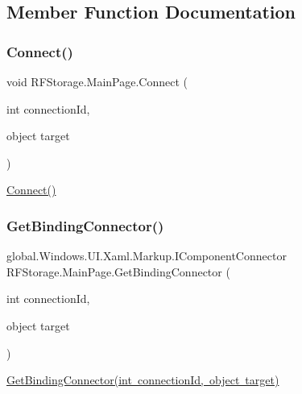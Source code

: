 \subsection{Member Function Documentation}
\mbox{\label{class_r_f_storage_1_1_main_page_a3d153ccb2e1e207f6861ab7734d25553}} 
\subsubsection{\texorpdfstring{Connect()}{Connect()}}
{\footnotesize\ttfamily void R\+F\+Storage.\+Main\+Page.\+Connect (\begin{DoxyParamCaption}\item[{int}]{connection\+Id,  }\item[{object}]{target }\end{DoxyParamCaption})}



\mbox{\hyperlink{class_r_f_storage_1_1_main_page_a3d153ccb2e1e207f6861ab7734d25553}{Connect()}} 

\mbox{\label{class_r_f_storage_1_1_main_page_ad0016dfc7ea25fce116dcb6066271970}} 
\subsubsection{\texorpdfstring{GetBindingConnector()}{GetBindingConnector()}}
{\footnotesize\ttfamily global.\+Windows.\+U\+I.\+Xaml.\+Markup.\+I\+Component\+Connector R\+F\+Storage.\+Main\+Page.\+Get\+Binding\+Connector (\begin{DoxyParamCaption}\item[{int}]{connection\+Id,  }\item[{object}]{target }\end{DoxyParamCaption})}



\mbox{\hyperlink{class_r_f_storage_1_1_main_page_ad0016dfc7ea25fce116dcb6066271970}{Get\+Binding\+Connector(int connection\+Id, object target)}} 

\mbox{\label{class_r_f_storage_1_1_main_page_a44b868cd44ff5ee9dbe953b104a1f9a1}} 
